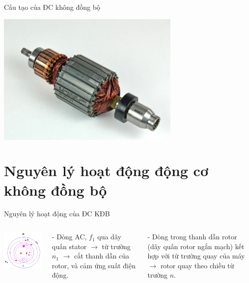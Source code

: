 \documentclass[17pt]{beamer}
\begin{document}
\begin{frame}[t]{Cấu tạo của ĐC không đồng bộ}
\begin{center}
\includegraphics[scale=.4]{images-chude1/rotor-day-quan.png} 
\end{center}
\end{frame}

\section[Nguyên lý hoạt động]{Nguyên lý hoạt động động cơ không đồng bộ}
\begin{frame}{Nguyên lý hoạt động của ĐC KĐB}
\begin{columns}
\vspace{-3cm}
\begin{center}
\includegraphics[scale=.5]{images-chude1/nguyenlylamviec.png} 
\end{center}
- Dòng AC, $f_1$ qua dây quấn stator $\rightarrow$ từ trường $n_1$ $\rightarrow$ cắt thanh dẫn của rotor, và cảm ứng suất điện động.

- Dòng trong thanh dẫn rotor (dây quấn rotor ngắn mạch) kết hợp với từ trường quay của máy $\rightarrow$ rotor quay theo chiều từ trường $n$.
\end{columns}
\end{frame}
\end{document}
